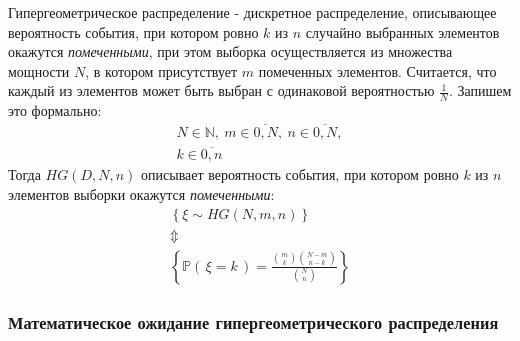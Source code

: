 \documentclass[
  russian,
  a4paper,
  russian]{scrreprt}
\begin{document}
Гипергеометрическое распределение - дискретное распределение,
описывающее вероятность события, при котором ровно \(k\) из \(n\)
случайно выбранных элементов окажутся \emph{помеченными}, при этом
выборка осуществляется из множества мощности \(N\), в котором
присутствует \(m\) помеченных элементов. Считается, что каждый из
элементов может быть выбран с одинаковой вероятностью \(\frac{1}{N}\).
Запишем это формально: \[\begin{gathered}
    N \in \mathbb{N},\ m \in \overline{0, N},\ n \in \overline{0, N},\\
    k \in \overline{0, n}
\end{gathered}\] Тогда \(HG(D, N, n)\) описывает вероятность события,
при котором ровно \(k\) из \(n\) элементов выборки окажутся
\emph{помеченными}: \[\begin{gathered}
    \left\{\xi \sim HG(N, m, n) \right\}\\
    \Updownarrow\\
    \left\{\mathbb{P}\left(\, \xi=k \,\right) = \frac{\binom{m}{k}\binom{N-m}{n-k}}{\binom{N}{n}}\right\}
\end{gathered}\]

\hypertarget{ux43cux430ux442ux435ux43cux430ux442ux438ux447ux435ux441ux43aux43eux435-ux43eux436ux438ux434ux430ux43dux438ux435-ux433ux438ux43fux435ux440ux433ux435ux43eux43cux435ux442ux440ux438ux447ux435ux441ux43aux43eux433ux43e-ux440ux430ux441ux43fux440ux435ux434ux435ux43bux435ux43dux438ux44f}{%
\subsubsection{Математическое ожидание гипергеометрического
распределения}\label{ux43cux430ux442ux435ux43cux430ux442ux438ux447ux435ux441ux43aux43eux435-ux43eux436ux438ux434ux430ux43dux438ux435-ux433ux438ux43fux435ux440ux433ux435ux43eux43cux435ux442ux440ux438ux447ux435ux441ux43aux43eux433ux43e-ux440ux430ux441ux43fux440ux435ux434ux435ux43bux435ux43dux438ux44f}}
\end{document}
